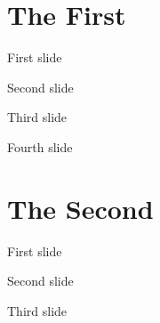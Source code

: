 \documentclass{beamer}
\begin{document}
    \section{The First}

    \begin{frame}
        First slide
    \end{frame}

    \begin{frame}
        Second slide
    \end{frame}

    \begin{frame}
        Third slide
    \end{frame}

    \begin{frame}
        Fourth slide
    \end{frame}

    \section{The Second}

    \begin{frame}
        First slide
    \end{frame}

    \begin{frame}
        Second slide
    \end{frame}

    \begin{frame}
        Third slide
    \end{frame}
\end{document}
